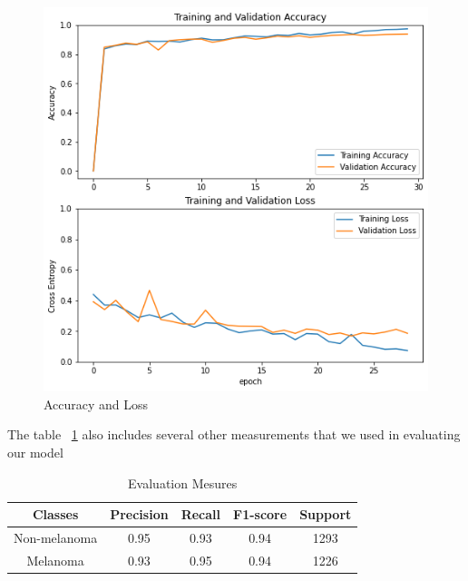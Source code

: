     \begin{figure}[htbp]
    \begin{center}
    \includegraphics[width=15cm]{./chapter-05-our-contribution/1.png}
    \end{center}
    \caption{Accuracy and Loss}
    \label{fig:acc-loss}
    \end{figure}

    The table ~\ref{tab:eval} also includes several other measurements that we used in evaluating our model


    \begin{table}[htbp]
    \begin{center}
        \begin{tabular}{|c|c|c|c|c|}
        \hline 
        Classes & Precision & Recall & F1-score & Support \\ 
        \hline 
        Non-melanoma & 0.95 & 0.93 & 0.94 & 1293 \\ 
        \hline 
        Melanoma & 0.93 & 0.95 & 0.94 & 1226 \\ 
        \hline 
        \end{tabular} 
    \end{center}
    \caption{Evaluation Mesures}
    \label{tab:eval}
    \end{table}






